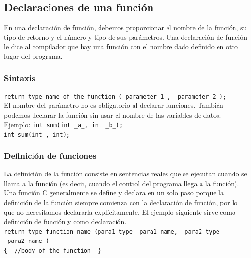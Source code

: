 \documentclass{article}
\begin{document}
\subsection{Declaraciones de una función}
En una declaración de función, debemos proporcionar el nombre de la función, su tipo de retorno y el número y tipo de sus parámetros. Una declaración de función le dice al compilador que hay una función con el nombre dado definido en otro lugar del programa.

\subsubsection{Sintaxis}
\texttt{return\_type \*\*name\_of\_the\_function\*\* (\_parameter\_1\_, \_parameter\_2\_);} \\
El nombre del parámetro no es obligatorio al declarar funciones. También podemos declarar la función sin usar el nombre de las variables de datos. Ejemplo: 
\texttt{int \*\*sum\*\*(int \_a\_, int \_b\_);\\
int \*\*sum\*\*(int , int);} \\

\subsubsection{Definición de funciones}
La definición de la función consiste en sentencias reales que se ejecutan cuando se llama a la función (es decir, cuando el control del programa llega a la función). Una función C generalmente se define y declara en un solo paso porque la definición de la función siempre comienza con la declaración de función, por lo que no necesitamos declararla explícitamente. El ejemplo siguiente sirve como definición de función y como declaración.\\

\texttt{return\_type \*\*function\_name\*\* (para1\_type \_para1\_name,\_ para2\_type \_para2\_name\_) \\
\{
   \_//body of the function\_
\}
}
\end{document}

